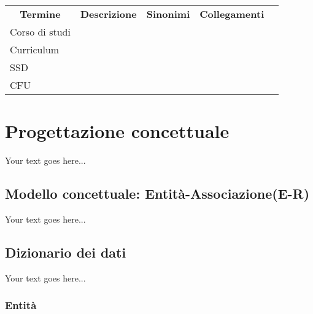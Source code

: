 \documentclass[a4paper,12pt,italian,towside]{article}
\begin{document}
\begin{table}[]
	\begin{tabular}{lllll}
		\cline{1-4}
		\multicolumn{1}{c}{\textbf{Termine}} & \multicolumn{1}{c}{\textbf{Descrizione}} & \multicolumn{1}{c}{\textbf{Sinonimi}} & \multicolumn{1}{c}{\textbf{Collegamenti}} &  \\ \cline{1-4}
		Corso di  studi                      &                                          &                                       &                                           &  \\ \cline{1-4}
		Curriculum                           &                                          &                                       &                                           &  \\ \cline{1-4}
		SSD                                  &                                          &                                       &                                           &  \\ \cline{1-4}
		CFU                                  &                                          &                                       &                                           & 
	\end{tabular}
\end{table}




\newpage

\section{Progettazione concettuale}

Your text goes here...

\subsection{Modello concettuale: Entit\`a-Associazione(E-R)}

Your text goes here...

\subsection{Dizionario dei dati}

Your text goes here...

\subsubsection{Entit\`a}
\end{document}
